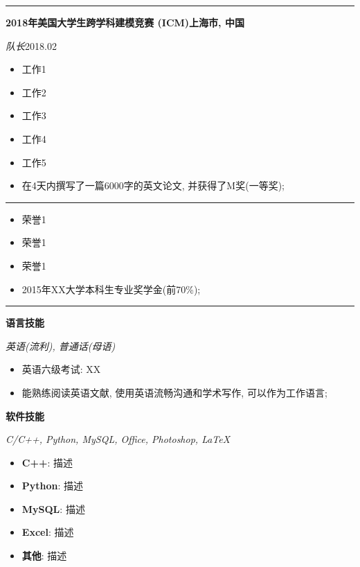\documentclass[12pt, a4paper, oneside]{ctexart}
\begin{document}
\vspace{-0.6em}
\noindent\rule{\textwidth}{1pt}

\noindent \textbf{2018年美国大学生跨学科建模竞赛 (ICM)}\hfill \textbf{上海市, 中国}

\textit{队长}\hfill 2018.02
\begin{itemize}
	\item 工作1
	\item 工作2
	\item 工作3
	\item 工作4
	\item 工作5
	\item 在4天内撰写了一篇6000字的英文论文, 并获得了M奖(一等奖);
\end{itemize}

\vspace{-0.6em}
\noindent\rule{\textwidth}{1pt}

\begin{itemize}
	\item 荣誉1
	\item 荣誉1
	\item 荣誉1
	\item 2015年XX大学本科生专业奖学金(前70\%);
\end{itemize}

\vspace{-0.6em}
\noindent\rule{\textwidth}{1pt}

\noindent \textbf{语言技能}

\textit{英语(流利), 普通话(母语)}
\begin{itemize}
	\item 英语六级考试: XX
	\item 能熟练阅读英语文献, 使用英语流畅沟通和学术写作, 可以作为工作语言;
\end{itemize}

\noindent \textbf{软件技能}

\textit{C/C++, Python, MySQL, Office, Photoshop, \LaTeX}
\begin{itemize}
	\item \textbf{C++}: 描述
	\item \textbf{Python}: 描述
	\item \textbf{MySQL}: 描述
	\item \textbf{Excel}: 描述
	\item \textbf{其他}: 描述
\end{itemize}

\thispagestyle{empty}
\end{document}
